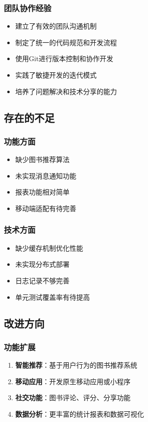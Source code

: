 \documentclass[12pt,a4paper]{article}
\begin{document}
\subsubsection{团队协作经验}
\begin{itemize}
    \item 建立了有效的团队沟通机制
    \item 制定了统一的代码规范和开发流程
    \item 使用Git进行版本控制和协作开发
    \item 实践了敏捷开发的迭代模式
    \item 培养了问题解决和技术分享的能力
\end{itemize}

\subsection{存在的不足}

\subsubsection{功能方面}
\begin{itemize}
    \item 缺少图书推荐算法
    \item 未实现消息通知功能
    \item 报表功能相对简单
    \item 移动端适配有待完善
\end{itemize}

\subsubsection{技术方面}
\begin{itemize}
    \item 缺少缓存机制优化性能
    \item 未实现分布式部署
    \item 日志记录不够完善
    \item 单元测试覆盖率有待提高
\end{itemize}

\subsection{改进方向}

\subsubsection{功能扩展}
\begin{enumerate}
    \item \textbf{智能推荐}：基于用户行为的图书推荐系统
    \item \textbf{移动应用}：开发原生移动应用或小程序
    \item \textbf{社交功能}：图书评论、评分、分享功能
    \item \textbf{数据分析}：更丰富的统计报表和数据可视化
\end{enumerate}
\end{document}
